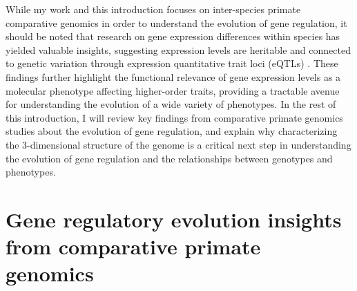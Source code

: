 {While my work and this introduction focuses on inter-species primate comparative genomics in order to understand the evolution of gene regulation, it should be noted that research on gene expression differences within species has yielded valuable insights, suggesting expression levels are heritable and connected to genetic variation through expression quantitative trait loci (eQTLs) \cite{Majewski and Pastinen 2010 (The study of eQTL variations...), Gilad, Rifkin, and Pritchard 2008 (Revealing the architecture...)}. These findings further highlight the functional relevance of gene expression levels as a molecular phenotype affecting higher-order traits, providing a tractable avenue for understanding the evolution of a wide variety of phenotypes. In the rest of this introduction, I will review key findings from comparative primate genomics studies about the evolution of gene regulation, and explain why characterizing the 3-dimensional structure of the genome is a critical next step in understanding the evolution of gene regulation and the relationships between genotypes and phenotypes.

\section{Gene regulatory evolution insights from comparative primate genomics}

}
